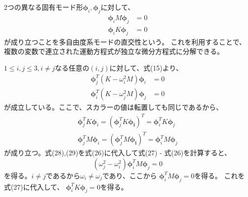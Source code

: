 \documentclass[a4paper]{jsarticle}
\begin{document}
\subsection{}
2つの異なる固有モード形$\boldsymbol{\phi}_i, \boldsymbol{\phi}_j$に対して、
\begin{align}
  \boldsymbol{\phi}_i M \boldsymbol{\phi}_j &= 0 \\
  \boldsymbol{\phi}_i K \boldsymbol{\phi}_j &= 0
\end{align}
が成り立つことを多自由度系モードの直交性という。
これを利用することで、複数の変数で連立された運動方程式が独立な微分方程式に分解できる。\par
$1 \leq i, j \leq 3, i \neq j$なる任意の$(i, j)$に対して、式(15)より、
\begin{align}
  \boldsymbol{\phi}_j^T (K - \omega_i^2 M) \boldsymbol{\phi}_i &= 0 \\
  \boldsymbol{\phi}_i^T (K - \omega_j^2 M) \boldsymbol{\phi}_j &= 0
\end{align}
が成立している。ここで、スカラーの値は転置しても同じであるから、
\begin{align}
  \boldsymbol{\phi}_j^T K \boldsymbol{\phi}_i =
  \left(\boldsymbol{\phi}_j^T K \boldsymbol{\phi_i}\right)^T =
  \boldsymbol{\phi}_i^T K \boldsymbol{\phi}_j \\
  \boldsymbol{\phi}_j^T M \boldsymbol{\phi}_i =
  \left(\boldsymbol{\phi}_j^T M \boldsymbol{\phi_i}\right)^T =
  \boldsymbol{\phi}_i^T M \boldsymbol{\phi}_j
\end{align}
が成り立つ。式(28),(29)を式(26)に代入して式(27) - 式(26)を計算すると、
\begin{equation}
  (\omega_j^2 - \omega_i^2) \boldsymbol{\phi}_i^T M \boldsymbol{\phi}_j = 0
\end{equation}
を得る。$i \neq j$であるから$\omega_i \neq \omega_j$であり、ここから
$\boldsymbol{\phi}_i^T M \boldsymbol{\phi}_j = 0$を得る。
これを式(27)に代入して、
$\boldsymbol{\phi}_i^T K \boldsymbol{\phi}_j = 0$を得る。
\end{document}
